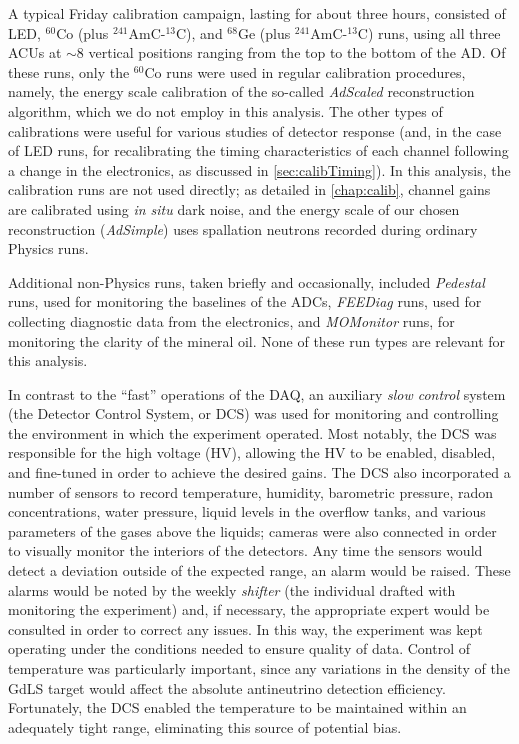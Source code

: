 \documentclass[../thesis.tex]{subfiles}
\begin{document}
A typical Friday calibration campaign, lasting for about three hours, consisted of LED, $^{60}$Co (plus $^{241}$AmC-$^{13}$C), and $^{68}$Ge (plus $^{241}$AmC-$^{13}$C) runs, using all three ACUs at $\sim$8 vertical positions ranging from the top to the bottom of the AD. Of these runs, only the $^{60}$Co runs were used in regular calibration procedures, namely, the energy scale calibration of the so-called \emph{AdScaled} reconstruction algorithm, which we do not employ in this analysis. The other types of calibrations were useful for various studies of detector response (and, in the case of LED runs, for recalibrating the timing characteristics of each channel following a change in the electronics, as discussed in \autoref{sec:calibTiming}). In this analysis, the calibration runs are not used directly; as detailed in \autoref{chap:calib}, channel gains are calibrated using \emph{in situ} dark noise, and the energy scale of our chosen reconstruction (\emph{AdSimple}) uses spallation neutrons recorded during ordinary Physics runs.

Additional non-Physics runs, taken briefly and occasionally, included \emph{Pedestal} runs, used for monitoring the baselines of the ADCs, \emph{FEEDiag} runs, used for collecting diagnostic data from the electronics, and \emph{MOMonitor} runs, for monitoring the clarity of the mineral oil. None of these run types are relevant for this analysis.

In contrast to the ``fast'' operations of the DAQ, an auxiliary \emph{slow control} system (the Detector Control System, or DCS) was used for monitoring and controlling the environment in which the experiment operated. Most notably, the DCS was responsible for the high voltage (HV), allowing the HV to be enabled, disabled, and fine-tuned in order to achieve the desired gains. The DCS also incorporated a number of sensors to record temperature, humidity, barometric pressure, radon concentrations, water pressure, liquid levels in the overflow tanks, and various parameters of the gases above the liquids; cameras were also connected in order to visually monitor the interiors of the detectors. Any time the sensors would detect a deviation outside of the expected range, an alarm would be raised. These alarms would be noted by the weekly \emph{shifter} (the individual drafted with monitoring the experiment) and, if necessary, the appropriate expert would be consulted in order to correct any issues. In this way, the experiment was kept operating under the conditions needed to ensure quality of data. Control of temperature was particularly important, since any variations in the density of the GdLS target would affect the absolute antineutrino detection efficiency. Fortunately, the DCS enabled the temperature to be maintained within an adequately tight range, eliminating this source of potential bias.

\subfilebackmatter
\end{document}
